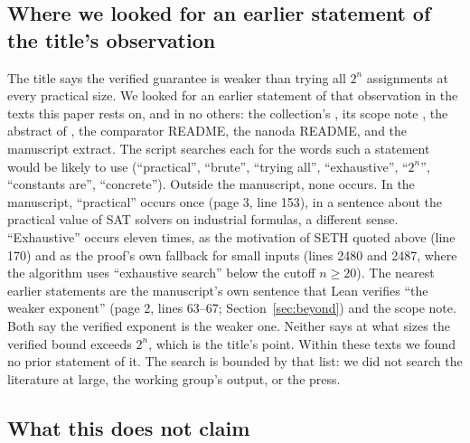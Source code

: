 \subsection{Where we looked for an earlier statement of the title's observation}
\label{sec:related-search}

The title says the verified guarantee is weaker than trying all $2^n$
assignments at every practical size. We looked for an earlier statement
of that observation in the texts this paper rests on, and in no others:
the collection's , its scope note
, the abstract of
\citet{SienickiSienicki2026}, the comparator README, the nanoda README,
and the manuscript extract. The script searches each for the words such
a statement would be likely to use (``practical'', ``brute'', ``trying
all'', ``exhaustive'', ``$2^n$'', ``constants are'', ``concrete''). Outside
the manuscript, none occurs. In the manuscript, ``practical'' occurs once
(page 3, line 153), in a sentence about the practical value of SAT
solvers on industrial formulas, a different sense. ``Exhaustive'' occurs
eleven times, as the motivation of SETH quoted above (line 170) and as the
proof's own fallback for small inputs (lines 2480 and 2487, where the
algorithm uses ``exhaustive search'' below the cutoff
$n \ge 20$). The nearest earlier statements are the manuscript's own
sentence that Lean verifies ``the weaker exponent'' (page 2, lines
63--67; Section~\ref{sec:beyond}) and the scope note. Both say the
verified exponent is the weaker one. Neither says at what sizes the
verified bound exceeds $2^n$, which is the title's point. Within these
texts we found no prior statement of it. The search is bounded by that
list: we did not search the literature at large, the working group's
output, or the press.

\subsection{What this does not claim}
\label{sec:related-not}

